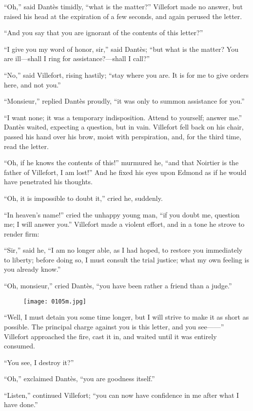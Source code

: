 “Oh,” said Dantès timidly, “what is the matter?” Villefort made no
answer, but raised his head at the expiration of a few seconds, and
again perused the letter.

“And you say that you are ignorant of the contents of this letter?”

“I give you my word of honor, sir,” said Dantès; “but what is the
matter? You are ill—shall I ring for assistance?—shall I call?”

“No,” said Villefort, rising hastily; “stay where you are. It is for me
to give orders here, and not you.”

“Monsieur,” replied Dantès proudly, “it was only to summon assistance
for you.”

“I want none; it was a temporary indisposition. Attend to yourself;
answer me.” Dantès waited, expecting a question, but in vain. Villefort
fell back on his chair, passed his hand over his brow, moist with
perspiration, and, for the third time, read the letter.

“Oh, if he knows the contents of this!” murmured he, “and that Noirtier
is the father of Villefort, I am lost!” And he fixed his eyes upon
Edmond as if he would have penetrated his thoughts.

“Oh, it is impossible to doubt it,” cried he, suddenly.

“In heaven’s name!” cried the unhappy young man, “if you doubt me,
question me; I will answer you.” Villefort made a violent effort, and
in a tone he strove to render firm:

“Sir,” said he, “I am no longer able, as I had hoped, to restore you
immediately to liberty; before doing so, I must consult the trial
justice; what my own feeling is you already know.”

“Oh, monsieur,” cried Dantès, “you have been rather a friend than a
judge.”

\begin{figure}[ht]
\texttt{[image: 0105m.jpg]}
\end{figure}

“Well, I must detain you some time longer, but I will strive to make it
as short as possible. The principal charge against you is this letter,
and you see——” Villefort approached the fire, cast it in, and waited
until it was entirely consumed.

“You see, I destroy it?”

“Oh,” exclaimed Dantès, “you are goodness itself.”

“Listen,” continued Villefort; “you can now have confidence in me after
what I have done.”

